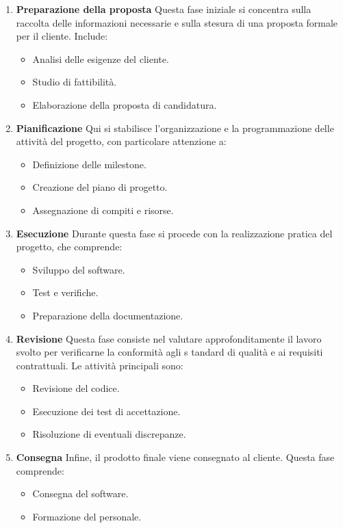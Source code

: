 \begin{enumerate}
    \item \textbf{Preparazione della proposta}  
    Questa fase iniziale si concentra sulla raccolta delle informazioni necessarie e sulla stesura di una proposta formale per il cliente. Include:  
    \begin{itemize}
        \item Analisi delle esigenze del cliente.  
        \item Studio di fattibilità.  
        \item Elaborazione della proposta di candidatura.  
    \end{itemize}
    
    \item \textbf{Pianificazione}  
    Qui si stabilisce l’organizzazione e la programmazione delle attività del progetto, con particolare attenzione a:  
    \begin{itemize}
        \item Definizione delle milestone.  
        \item Creazione del piano di progetto.  
        \item Assegnazione di compiti e risorse.  
    \end{itemize}
    
    \item \textbf{Esecuzione}  
    Durante questa fase si procede con la realizzazione pratica del progetto, che comprende:  
    \begin{itemize}
        \item Sviluppo del software.  
        \item Test e verifiche.  
        \item Preparazione della documentazione.  
    \end{itemize}
    
    \item \textbf{Revisione}  
    Questa fase consiste nel valutare approfonditamente il lavoro svolto per verificarne la conformità agli s
    tandard di qualità e ai requisiti contrattuali. Le attività principali sono:  
    \begin{itemize}
        \item Revisione del codice.  
        \item Esecuzione dei test di accettazione.  
        \item Risoluzione di eventuali discrepanze.  
    \end{itemize}
    
    \item \textbf{Consegna}  
    Infine, il prodotto finale viene consegnato al cliente. Questa fase comprende:  
    \begin{itemize}
        \item Consegna del software.  
        \item Formazione del personale.  
    \end{itemize}
\end{enumerate}


